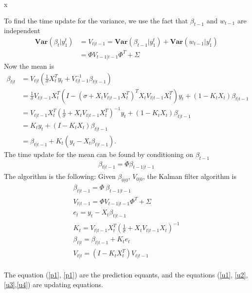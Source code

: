 \message{ !name(kalman_filter.tex)}x\documentclass{article}
\numberwithin{algorithm}{section}
\theoremstyle{plain}
\theoremstyle{definition}
\theoremstyle{remark}
\newcommand{\Var}{\mathbf{Var}}
\begin{document}
To find the time update for the variance, we use the fact that $\beta_{t-1}$ and $w_{t-1}$ are independent
\begin{equation}
\begin{split}
\Var(\beta_t|y^t_1) &= V_{t|t-1} = \Var(\beta_{t-1}|y^t_1) + \Var(w_{t-1}|y^t_1)\\
&= \Phi V_{t-1|t-1}\Phi ^T + \Sigma
\end{split}
\end{equation}
Now the mean is
\begin{equation}
\begin{split}
\beta_{t|t} &= V_{t|t} ( \frac1\sigma X_t^T y_t + V_{t|t-1}^{-1} \beta_{t|t-1})\\
&= \frac1\sigma V_{t|t-1} X_t^T (I - (\sigma + X_t V_{t|t-1} X_t^T )^T X_t  V_{t|t-1} X_t^T) y_t+ (1-K_t X_t) \beta_{t|t-1}\\
&= V_{t|t-1} X_t^T ( \frac1\sigma + X_t V_{t|t-1} X_t^T)^{-1} y_t + (1-K_t X_t) \beta_{t|t-1}\\
&= K_t y_t + (I - K_t X_t) \beta_{t|t-1}\\
&= \beta_{t|t-1}+ K_t (y_t - X_t \beta_{t|t-1}).
\end{split}
\end{equation}
The time update for the mean can be found by conditioning on $\beta_{t-1}$
\begin{equation}
\begin{split}
\beta_{t|t-1} =\Phi  \beta_{t-1|t-1}
\end{split}
\end{equation}
The algorithm is the following:
Given $\beta_{0|0}$, $V_{0|0}$, the Kalman filter algorithm is
\begin{eqnarray}
\beta_{t|t-1} = \Phi \: \beta_{t-1|t-1}\label{p1}\\
V_{t|t-1} = \Phi  V_{t-1|t-1} \Phi ^T + \Sigma \label{p2}\\
e_t = y_t -  X_t \beta_{t|t-1} \label{u1}\\
K_t =  V_{t|t-1} X_t^T (\frac1\sigma + X_t V_{t|t-1} X_t )^{-1}\label{u4}\\
\beta_{t|t} = \beta_{t|t-1} + K_t e_t\label{u2}\\
V_{t|t} = (I - K_t X_t^T) V_{t|t-1}\label{u3}\\
\end{eqnarray}

The equation (\ref{p1}, \ref{p1}) are the prediction equants, and the equations (\ref{u1}, \ref{u2}, \ref{u3},\ref{u4}) are updating equations.
\end{document}
